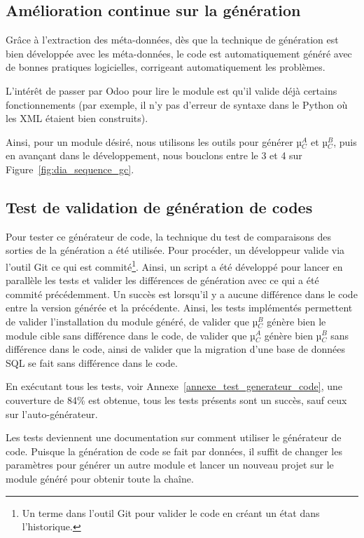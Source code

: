 \subsection {Amélioration continue sur la génération}

Grâce à l’extraction des méta-données, dès que la technique de génération est bien développée avec les méta-données, le code est automatiquement généré avec de bonnes pratiques logicielles, corrigeant automatiquement les problèmes.

L’intérêt de passer par Odoo pour lire le module est qu'il valide déjà certains fonctionnements (par exemple, il n'y pas d’erreur de syntaxe dans le Python où les XML étaient bien construits).

Ainsi, pour un module désiré, nous utilisons les outils pour générer µ$_C^A$ et µ$_C^B$, puis en avançant dans le développement, nous bouclons entre le 3 et 4 sur Figure~\ref{fig:dia_sequence_gc}.

\subsection {Test de validation de génération de codes}\label{test_validation_generation_code_resultat}

Pour tester ce générateur de code, la technique du test de comparaisons des sorties de la génération a été utilisée. Pour procéder, un développeur valide via l'outil Git ce qui est commité\footnote{Un terme dans l'outil Git pour valider le code en créant un état dans l'historique.}. Ainsi, un script a été développé pour lancer en parallèle les tests et valider les différences de génération avec ce qui a été commité précédemment. Un succès est lorsqu'il y a aucune différence dans le code entre la version générée et la précédente. Ainsi, les tests implémentés permettent de valider l’installation du module généré, de valider que µ$_C^B$ génère bien le module cible sans différence dans le code, de valider que µ$_C^A$ génère bien µ$_C^B$ sans différence dans le code, ainsi de valider que la migration d’une base de données SQL se fait sans différence dans le code.

En exécutant tous les tests, voir Annexe~\ref{annexe_test_generateur_code}, une couverture de 84\% est obtenue, tous les tests présents sont un succès, sauf ceux sur l’auto-générateur.

Les tests deviennent une documentation sur comment utiliser le générateur de code. Puisque la génération de code se fait par données, il suffit de changer les paramètres pour générer un autre module et lancer un nouveau projet sur le module généré pour obtenir toute la chaîne.

